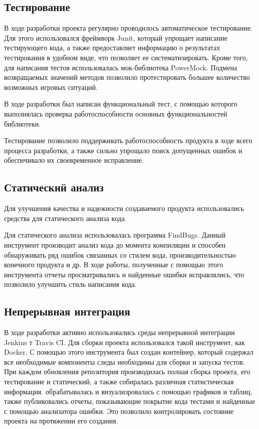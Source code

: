 \subsection{Тестирование}

В ходе разработки проекта регулярно проводилось автоматическое тестирование. Для этого использовался фреймворк Junit, который упрощает написание тестирующего кода, а также предоставляет информацию о результатах тестирования в удобном виде, что позволяет ее систематизировать. Кроме того, для написания тестов использовалась мок-библиотека PowerMock. Подмена возвращаемых значений методов позволило протестировать большее количество возможных игровых ситуаций.  

В ходе разработки был написан функциональный тест, с помощью которого выполнялась проверка работоспособности основных функциональностей библиотеки.

Тестирование позволило поддерживать работоспособность продукта в ходе всего процесса разработки, а также сильно упрощало поиск допущенных ошибок и обеспечивало их своевременное исправление.   

\subsection{Статический анализ}

Для улучшения качества и надежности создаваемого продукта использовались средства для статического анализа кода.

Для статического анализа использовалась программа FindBugs. Данный инструмент производит анализ кода до момента компиляции и способен обнаруживать ряд ошибок связанных со стилем кода, производительностью конечного продукта и др. В ходе работы, полученные с помощью этого инструмента отчеты просматривались и найденные ошибки исправлялись, что позволило улучшить стиль написания кода.

\subsection{Непрерывная интеграция}

В ходе разработки активно использовались среды непрерывной интеграции Jenkins т Travis CI. Для сборки проекта использовался такой инструмент, как Docker. С помощью этого инструмента был создан контейнер, который содержал все необходимые компоненты следы необходимы для сборки и запуска тестов. При каждом обновления репозитория производилась полная сборка проекта, его тестирование и статический, а также собиралась различная статистическая информация. обрабатывалась и визуализровалась с помощью графиков и таблиц, также публиковались отчеты, показывающие покрытие кода тестами и найденные с помощью анализатора ошибки. Это позволило контролировать состояние проекта на протяжении его создания.  
